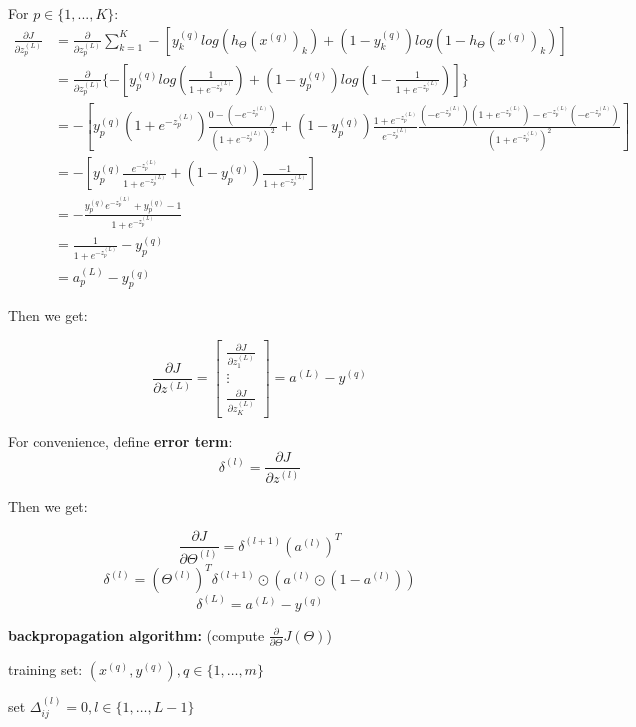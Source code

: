 \documentclass{article}
\begin{document}
\noindent For \(p \in \{1, ..., K\}\):
\begin{equation*}
\begin{split}
\frac{\partial J}{\partial z_p^{(L)}} 
& = \frac{\partial}{\partial z_p^{(L)}} \sum_{k = 1}^{K} -[y^{(q)}_k log(h_{\Theta} (x^{(q)})_k) + (1 - y^{(q)}_k) log(1 - h_{\Theta}(x^{(q)})_k)] \\
& = \frac{\partial}{\partial z_p^{(L)}} \{-[y^{(q)}_p log(\frac{1}{1 + e^{-z_p^{(L)}}}) + (1 - y^{(q)}_p) log(1 - \frac{1}{1 + e^{-z_p^{(L)}}})]\} \\
& = - [y^{(q)}_p (1 + e^{-z_p^{(L)}}) \frac{0 - (-e^{-z_p^{(L)}})}{(1 + e^{-z_p^{(L)}})^2} + (1 - y^{(q)}_p) \frac{1 + e^{-z_p^{(L)}}}{e^{-z_p^{(L)}}} \frac{(-e^{-z_p^{(L)}})(1 + e^{-z_p^{(L)}}) - e^{-z_p^{(L)}}(-e^{-z_p^{(L)}})}{(1 + e^{-z_p^{(L)}})^2}] \\
& = - [y_p^{(q)} \frac{e^{-z_p^{(L)}}}{1 + e^{-z_p^{(L)}}} + (1 - y_p^{(q)}) \frac{-1}{1 + e^{-z_p^{(L)}}}] \\
& = - \frac{y_p^{(q)}e^{-z_p^{(L)}} + y_p^{(q)} - 1}{1 + e^{-z_p^{(L)}}} \\
& = \frac{1}{1 + e^{-z_p^{(L)}}} - y_p^{(q)} \\ 
& = a_p^{(L)} - y_p^{(q)}
\end{split}
\end{equation*}

\noindent Then we get:

\[\frac{\partial J}{\partial z^{(L)}} = 
\begin{bmatrix}
\frac{\partial J}{\partial z_1^{(L)}} \\
\vdots \\
\frac{\partial J}{\partial z_K^{(L)}}
\end{bmatrix}
= a^{(L)} - y^{(q)}
\]

\noindent For convenience, define \textbf{error term}: 
\[\delta^{(l)} = \frac{\partial J}{\partial z^{(l)}}\]

\noindent Then we get:

\[\frac{\partial J}{\partial \Theta^{(l)}} = \delta^{(l + 1)} (a^{(l)})^T\]
\[\delta^{(l)} = (\Theta^{(l)})^T \delta^{(l + 1)} \odot (a^{(l)} \odot (1 - a^{(l)}))\]
\[\delta^{(L)} = a^{(L)} - y^{(q)}\]

\noindent \textbf{backpropagation algorithm:} (compute \(\frac{\partial}{\partial \Theta} J(\Theta)\))

\noindent training set: \((x^{(q)}, y^{(q)}), q \in \{1, \dots, m\}\)

\noindent set \(\Delta_{ij}^{(l)} = 0, l \in \{1, \dots, L - 1\}\)
\end{document}
